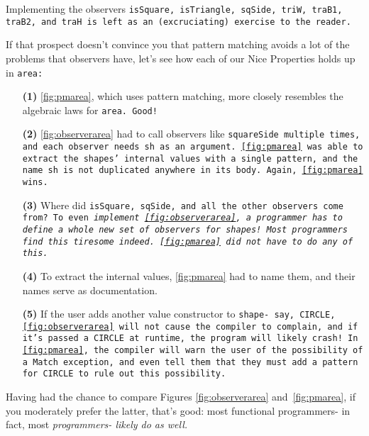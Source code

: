 \documentclass[manuscript,screen,review, 12pt, nonacm]{acmart}
\begin{document}
    Implementing the observers \tt{isSquare}, \tt{isTriangle}, \tt{sqSide},
    \tt{triW}, \tt{traB1}, \tt{traB2}, and \tt{traH} is left as an
    (excruciating) exercise to the reader. 
    
    If that prospect doesn't convince you that pattern matching avoids a lot of
    the problems that observers have, let's see how each of our Nice Properties
    holds up in \tt{area}: 
    
    \begin{enumerate}
        \item[\bf{(1)}] \ref{fig:pmarea}, which uses pattern matching, more
        closely resembles the algebraic laws for \tt{area}. Good! 
        \item[\bf{(2)}] \ref{fig:observerarea} had to call observers like
        \tt{squareSide} multiple times, and each observer needs \tt{sh} as an
        argument. \ref{fig:pmarea} was able to extract the \tt{shape}s' internal
        values with a single pattern, and the name \tt{sh} is not duplicated
        anywhere in its body. Again, \ref{fig:pmarea} wins. 
        \item[\bf{(3)}] Where did \tt{isSquare}, \tt{sqSide}, and all the other
        observers come from? To even \it{implement} \ref{fig:observerarea}, a
        programmer has to define a whole new set of observers for \tt{shape}s!
        Most programmers find this tiresome indeed. \ref{fig:pmarea} did not
        have to do any of this. 
        \item[\bf{(4)}] To extract the internal values, \ref{fig:pmarea} had to
        name them, and their names serve as documentation. 
        \item[\bf{(5)}] If the user adds another value constructor to
        \tt{shape}- say, \tt{CIRCLE}, \ref{fig:observerarea} will not cause the
        compiler to complain, and if it's passed a \tt{CIRCLE} at runtime, the
        program will likely crash! In \ref{fig:pmarea}, the compiler will warn
        the user of the possibility of a \tt{Match} exception, and even tell
        them that they must add a pattern for \tt{CIRCLE} to rule out this
        possibility. 
    \end{enumerate}

    Having had the chance to compare Figures \ref{fig:observerarea}
    and~\ref{fig:pmarea}, if you moderately prefer the latter, that's good: most
    functional programmers- in fact, most \it{programmers}- likely do as well. 
\end{document}
